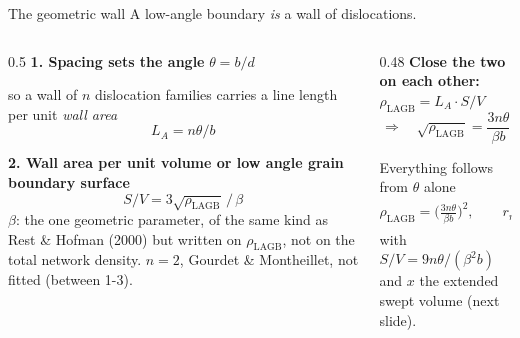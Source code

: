 \documentclass[10pt,aspectratio=169]{beamer}
\begin{document}
\begin{frame}{The geometric wall}
  A low-angle boundary \emph{is} a wall of dislocations.
  \vspace{0.5em}
  \begin{columns}[T]
    \begin{column}{0.5\textwidth}
      \textbf{1. Spacing sets the angle} \quad $\theta = b/d$

      so a wall of $n$ dislocation families carries a line length per unit \emph{wall area}
      \[ L_A = n\theta/b \]

      \textbf{2. Wall area per unit volume or low angle grain boundary surface}
      \[ S/V = 3\sqrt{\rho_{\text{LAGB}}}\,/\,\beta \]
      \footnotesize $\beta$: the one geometric parameter, of the same kind as Rest \& Hofman (2000) but written on $\rho_{\text{LAGB}}$, not on the total network density. $n = 2$, Gourdet \& Montheillet, not fitted (between 1-3).
    \end{column}
    \begin{column}{0.48\textwidth}
      \textbf{Close the two on each other:}
      $\rho_{\text{LAGB}} = L_A \cdot S/V$
      \[ \Longrightarrow\quad \sqrt{\rho_{\text{LAGB}}} = \frac{3n\theta}{\beta b} \]

      \begin{block}{Everything follows from $\theta$ alone}
        \[ \rho_{\text{LAGB}} = \Big(\tfrac{3n\theta}{\beta b}\Big)^{2},
           \qquad r_n = \min\!\Big(\frac{1.5}{(S/V)\,e^{-x}},\,R_{\text{grain}}\Big) \]
        with $S/V = 9n\theta/(\beta^{2}b)$ and $x$ the extended swept volume (next slide).
      \end{block}
    \end{column}
  \end{columns}
\end{frame}
\end{document}
